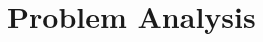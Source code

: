 \documentclass[Setup/main.tex]{subfiles}
\begin{document}
\section{Problem Analysis}
\end{document}
